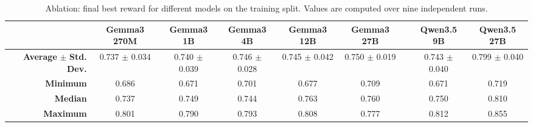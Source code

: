 \documentclass[sigconf,pbalance]{acmart_modified}
\begin{document}
\begin{table}[H]
    \caption{Ablation: final best reward for different models on the training split. Values are computed over nine independent runs.}
    \label{tab:reward_models}
    \vspace{-0.3cm}
    \centering
    \small
    \renewcommand{\arraystretch}{1.15}
    \setlength{\tabcolsep}{5pt}
    \begin{tabular}{rcccccccc}
    \toprule
    & \textbf{Gemma3 270M} & \textbf{Gemma3 1B} & \textbf{Gemma3 4B} & \textbf{Gemma3 12B} & \textbf{Gemma3 27B} & & \textbf{Qwen3.5 9B} & \textbf{Qwen3.5 27B} \\
    \midrule
\textbf{Average} $\pm$ \textbf{Std. Dev.}
      & \cellcolor{cellred!12}   0.737 $\pm$ 0.034
      & \cellcolor{cellred!8}    0.740 $\pm$ 0.039
      & \cellcolor{cellgreen!2}  0.746 $\pm$ 0.028
      & \cellcolor{cellgreen!1}  0.745 $\pm$ 0.042
      & \cellcolor{cellgreen!6}  0.750 $\pm$ 0.019
      &
      & \cellcolor{cellred!3}    0.743 $\pm$ 0.040
      & \cellcolor{cellgreen!35} 0.799 $\pm$ 0.040 \\
    \textbf{Minimum}
      & \cellcolor{cellred!58}   0.686
      & \cellcolor{cellred!100}  0.671
      & \cellcolor{cellred!31}   0.701
      & \cellcolor{cellred!83}   0.677
      & \cellcolor{cellred!18}   0.709
      &
      & \cellcolor{cellred!100}  0.671
      & \cellcolor{cellgreen!12} 0.719 \\
    \textbf{Median}
      & \cellcolor{cellred!4}     0.737
      & \cellcolor{cellgreen!11}  0.749
      & \cellcolor{cellgreen!3}   0.744
      & \cellcolor{cellgreen!35}  0.763
      & \cellcolor{cellgreen!30}  0.760
      &
      & \cellcolor{cellgreen!12}  0.750
      & \cellcolor{cellgreen!100} 0.810 \\
    \textbf{Maximum}
      & \cellcolor{cellgreen!63}  0.801
      & \cellcolor{cellgreen!24}  0.790
      & \cellcolor{cellgreen!29}  0.793
      & \cellcolor{cellgreen!71}  0.808
      & \cellcolor{cellgreen!1}   0.777
      &
      & \cellcolor{cellgreen!78}  0.812
      & \cellcolor{cellgreen!100} 0.855 \\
    \bottomrule
    \end{tabular}
\end{table}
\end{document}
